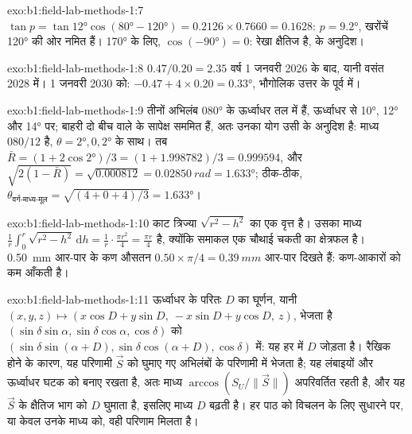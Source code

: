 \begin{solution}{exo:b1:field-lab-methods-1:7}
$\tan p = \tan\ang{12}\cos(\ang{80} - \ang{120}) = 0.2126\times0.7660 =
0.1628$: $p = \ang{9.2}$, खरोंचें \ang{120} की ओर नमित हैं।  \ang{170} के लिए, $\cos(\ang{-90}) = 0$: रेखा क्षैतिज है,
 के अनुदिश।
\end{solution}

\begin{solution}{exo:b1:field-lab-methods-1:8}
$0.47/0.20 = 2.35$ वर्ष 1 जनवरी 2026 के बाद, यानी वसंत 2028 में। 1 जनवरी 2030 को:
$-0.47 + 4\times0.20 = \ang{+0.33}$, भौगोलिक उत्तर के पूर्व में।
\end{solution}

\begin{solution}{exo:b1:field-lab-methods-1:9}
तीनों अभिलंब  \ang{080} के ऊर्ध्वाधर तल में हैं, ऊर्ध्वाधर से \ang{10}, \ang{12} और \ang{14} पर; बाहरी दो बीच वाले के
सापेक्ष सममित हैं, अतः उनका योग उसी के अनुदिश है: माध्य $080/12$ है, $\theta = \ang{2}, 0, \ang{2}$ के साथ। तब
$\bar R = (1 +
2\cos\ang{2})/3 = (1 + 1.998782)/3 = 0.999594$, और $\sqrt{2(1 - \bar R)} =
\sqrt{0.000812} = \qty{0.02850}{rad} = \ang{1.633}$; ठीक-ठीक,
$\theta_{\text{वर्ग-माध्य-मूल}} = \sqrt{(4 + 0 + 4)/3} = \ang{1.633}$।
\end{solution}

\begin{solution}{exo:b1:field-lab-methods-1:10}
काट त्रिज्या $\sqrt{r^2 - h^2}$ का एक वृत्त है। उसका माध्य
$\frac1r\int_0^r\sqrt{r^2 - h^2}\,\mathrm dh = \frac1r\cdot\frac{\pi r^2}{4}
= \frac{\pi r}{4}$ है, क्योंकि समाकल एक चौथाई चकती का क्षेत्रफल है। \qty{0.50}{mm} आर-पार के कण औसतन
$0.50\times\pi/4 = \qty{0.39}{mm}$ आर-पार दिखते हैं:  कण-आकारों को कम आँकती है।
\end{solution}

\begin{solution}{exo:b1:field-lab-methods-1:11}
ऊर्ध्वाधर के परितः $D$ का घूर्णन, यानी
$(x, y, z) \mapsto (x\cos D + y\sin D,\ -x\sin D + y\cos D,\ z)$, भेजता है
$(\sin\delta\sin\alpha, \sin\delta\cos\alpha, \cos\delta)$ को
$(\sin\delta\sin(\alpha + D), \sin\delta\cos(\alpha + D), \cos\delta)$ में: यह हर  में $D$ जोड़ता है। रैखिक होने
के कारण, यह परिणामी $\vec S$ को घुमाए गए अभिलंबों के परिणामी में भेजता है; यह लंबाइयों और ऊर्ध्वाधर घटक को बनाए
रखता है, अतः माध्य  $\arccos(S_U/\|\vec S\|)$ अपरिवर्तित रहती है, और यह $\vec S$ के क्षैतिज भाग को $D$ घुमाता है,
इसलिए माध्य  $D$ बढ़ती है। हर पाठ को विचलन के लिए सुधारने पर, या केवल उनके माध्य को, वही परिणाम मिलता है।
\end{solution}

